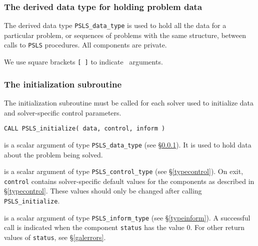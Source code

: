 \documentclass{galahad}
\newcommand{\packagename}{PSLS}
\begin{document}

\subsubsection{The derived data type for holding problem data}\label{typedata}
The derived data type
{\tt \packagename\_data\_type}
is used to hold all the data for a particular problem,
or sequences of problems with the same structure, between calls to
{\tt \packagename} procedures.
All components are private.


\galarguments
We use square brackets {\tt [ ]} to indicate \optional\ arguments.


\subsubsection{The initialization subroutine}\label{subinit}
The initialization subroutine must be called for each solver used
to initialize data and solver-specific control parameters.

\hskip0.5in
{\tt CALL \packagename\_initialize( data, control, inform )}
\begin{description}

 is a scalar \intentout argument of type
{\tt \packagename\_data\_type}
(see \S\ref{typedata}). It is used to hold data about the problem being
solved.

 is a scalar \intentout argument of type
{\tt \packagename\_control\_type}
(see \S\ref{typecontrol}).
On exit, {\tt control} contains solver-specific default values for the
components as described in \S\ref{typecontrol}.
These values should only be changed after calling
{\tt \packagename\_initialize}.

 is a scalar \intentout argument of type
{\tt \packagename\_inform\_type}
(see \S\ref{typeinform}).
A successful call is indicated when the  component {\tt status} has the value 0.
For other return values of {\tt status}, see \S\ref{galerrors}.

\end{description}

\end{document}
